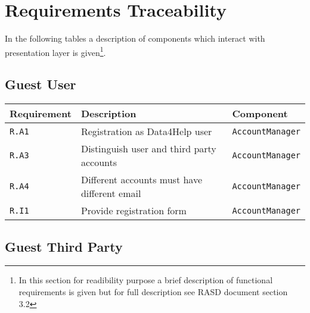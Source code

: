 \documentclass[../DD0.tex]{subfiles}
\begin{document}
\def \AccountManager {\texttt{AccountManager}}
\def \DataCollector {\texttt{DataCollector}}
\def \EmergencyDetector {\texttt{EmergencyDetector}}
\def \PaymentGateway {\texttt{PaymentGateway}}
\def \NotificationManager {\texttt{NotificationManager}}
\def \EmergencyDispatcher {\texttt{EmergencyDispatcher}}
\def \FilterManager {\texttt{FilterManager}}
\def \RequestManager {\texttt{RequestManager}}
\def \SetBuilder {\texttt{SetBuilder}}
\section{Requirements Traceability}
\label{sec:req}
In the following tables a description of components which interact with presentation layer is given\footnote{In this section for readibility purpose a brief description of functional requirements is given but for full description see RASD document section 3.2}.
\subsection{Guest User}

    \begin{table}[h!]

      \centering
      \begin{tabularx}{\linewidth}{|X|X|X|}
        \hline
        \textbf{Requirement} & \textbf{Description} & \textbf{Component} \\ \hline
        \texttt{R.A1} & Registration as Data4Help user &\texttt{\AccountManager} \\
        \hline
        \texttt{R.A3} & Distinguish user and third party accounts & \texttt{\AccountManager} \\
        \hline
        \texttt{R.A4} & Different accounts must have different email & \texttt{\AccountManager} \\
        \hline
        \texttt{R.I1} & Provide registration form  & \texttt{\AccountManager} \\
        \hline
      \end{tabularx}
      \label{tab:guestuser}

    \end{table}


\subsection{Guest Third Party}
\end{document}
